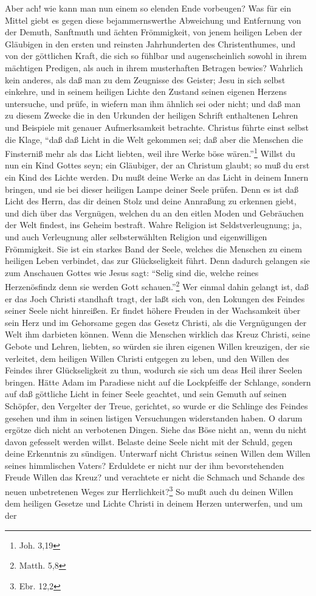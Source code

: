 Aber ach! wie kann man nun einem so elenden Ende vorbeugen? Was für ein Mittel giebt es gegen diese bejammernswerthe Abweichung und Entfernung von der Demuth, Sanftmuth und ächten Frömmigkeit, von jenem heiligen Leben der Gläubigen in den ersten und reinsten Jahrhunderten des Christenthumes, und von der göttlichen Kraft, die sich so fühlbar und augenscheinlich sowohl in ihrem mächtigen Predigen, als auch in ihrem musterhaften Betragen bewies? Wahrlich kein anderes, als daß man zu dem Zeugnisse des Geister; Jesu in sich selbst einkehre, und in seinem heiligen Lichte den Zustand seinen eigenen Herzens untersuche, und prüfe, in wiefern man ihm ähnlich sei oder nicht; und daß man zu diesem Zwecke die in den Urkunden der heiligen Schrift enthaltenen Lehren und Beispiele mit genauer Aufmerksamkeit betrachte. Christus führte einst selbst die Klage, "`daß daß Licht in die Welt gekommen sei; daß aber die Menschen die Finsterniß mehr als das Licht liebten, weil ihre Werke böse wären."'\footnote{Joh. 3,19} Willst du nun ein Kind Gottes seyn; ein Gläubiger, der an Christum glaubt; so muß du erst ein Kind des Lichte werden. Du mußt deine Werke an das Licht in deinem Innern bringen, und sie bei dieser heiligen Lampe deiner Seele prüfen. Denn es ist daß Licht des Herrn, das dir deinen Stolz und deine Annraßung zu erkennen giebt, und dich über das Vergnügen, welchen du an den eitlen Moden und Gebräuchen der Welt findest, ins Geheim bestraft. Wahre Religion ist Seldstverleugnung; ja, und auch Verleugnung aller selbsterwählten Religion und eigenwilligen Frömmigkeit. Sie ist ein starkes Band der Seele, welches die Menschen zu einem heiligen Leben verbindet, das zur Glückseligkeit führt. Denn dadurch gelangen sie zum Anschauen Gottes wie Jesus sagt: "`Selig sind die, welche reines Herzenösfindz denn sie werden Gott schauen."'\footnote{Matth. 5,8} Wer einmal dahin gelangt ist, daß er das Joch Christi standhaft tragt, der laßt sich von, den Lokungen des Feindes seiner Seele nicht hinreißen. Er findet höhere Freuden in der Wachsamkeit über sein Herz und im Gehorsame gegen das Gesetz Christi, als die Vergnügungen der Welt ihm darbieten können. Wenn die Menschen wirklich das Kreuz Christi, seine Gebote und Lehren, liebten, so würden sie ihren eigenen Willen kreuzigen, der sie verleitet, dem heiligen Willen Christi entgegen zu leben, und den Willen des Feindes ihrer Glückseligkeit zu thun, wodurch sie sich um deas Heil ihrer Seelen bringen. Hätte Adam im Paradiese nicht auf die Lockpfeiffe der Schlange, sondern auf daß göttliche Licht in feiner Seele geachtet, und sein Gemuth auf seinen Schöpfer, den Vergelter der Treue, gerichtet, so wurde er die Schlinge des Feindes gesehen und ihm in seinen listigen Versuchungen widerstanden haben. O darum ergötze dich nicht an verbotenen Dingen. Siehe das Böse nicht an, wenn du nicht davon gefesselt werden willst. Belaste deine Seele nicht mit der Schuld, gegen deine Erkenntnis zu sündigen. Unterwarf nicht Christus seinen Willen dem Willen seines himmlischen Vaters? Erduldete er nicht nur der ihm bevorstehenden Freude Willen das Kreuz? und verachtete er nicht die Schmach und Schande des neuen unbetretenen Weges zur Herrlichkeit?\footnote{Ebr. 12,2} So mußt auch du deinen Willen dem heiligen Gesetze und Lichte Christi in deinem Herzen unterwerfen, und um der 